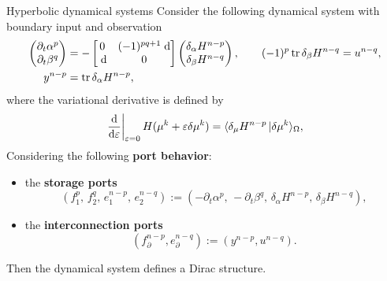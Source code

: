 \documentclass[aspectratio=169]{beamer}
\DeclareMathOperator{\tr}{tr}
\newcommand{\dualpr}[3][]{\ensuremath{\langle #2 \, \vert #3 \rangle_{#1}}}
\begin{document}
\begin{frame}{Hyperbolic dynamical systems}
	Consider the following dynamical system with boundary input and observation
	\begin{equation*}
	\begin{aligned}
		\begin{pmatrix}
			\partial_t \alpha^p \\
			\partial_t \beta^q\\
		\end{pmatrix} &= 
		-\begin{bmatrix}
			0 & (-1)^{pq+1}\d \\
			\d & 0 \\
		\end{bmatrix}
		\begin{pmatrix}
			\delta_{\alpha} H^{n-p}\\
			\delta_{\beta} H^{n-q}\\
		\end{pmatrix}, \qquad (-1)^p\tr \delta_{\beta} H^{n-q} = u^{n-q}, \\
		y^{n-p} &= \tr \delta_{\alpha} H^{n-p}, 
	\end{aligned}	
	\end{equation*}
where the variational derivative is defined by
\begin{equation*}
	\begin{aligned}
		\left.\diff{}{\varepsilon}\right|_{\varepsilon = 0} H({\mu}^k + \varepsilon \delta {\mu}^k) = \dualpr[\Omega]{\delta_{\mu} H^{n-p}}{\delta {\mu}^k},
	\end{aligned}
\end{equation*}
Considering the following \textbf{port behavior}:
\begin{itemize}
	\item
	the \textbf{storage ports} $$({f}_1^p,\, f_2^q,\, e_1^{n-p}, \, e_2^{n-q}) := (-\partial_t \alpha^p,\,  -\partial_t \beta^q, \,  \delta_{\alpha} H^{n-p}, \,  \delta_{\beta} H^{n-q}),$$
	\item
	the \textbf{interconnection ports} $$({f}_{\partial}^{n-p}, {e}_{\partial}^{n-q}) := ({y}^{n-p}, {u}^{n-q} ).$$
\end{itemize}
Then the dynamical system defines a Dirac structure.

\end{frame}
\end{document}
